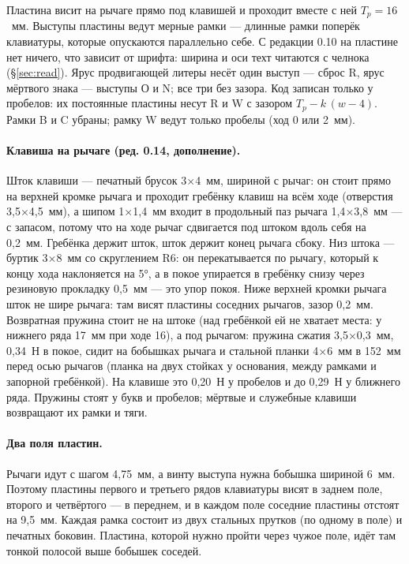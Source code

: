 Пластина висит на рычаге прямо под клавишей и проходит вместе с ней $T_p = 16$~мм. Выступы пластины ведут мерные рамки — длинные рамки поперёк клавиатуры, которые опускаются параллельно себе. С редакции 0.10 на пластине нет ничего, что зависит от шрифта: ширина и оси техт читаются с челнока (\S\ref{sec:read}). Ярус продвигающей литеры несёт один выступ — сброс R, ярус мёртвого знака — выступы О и N; все три без зазора. Код записан только у пробелов: их постоянные пластины несут R и W с зазором $T_p - k\,(w - 4)$. Рамки B и C убраны; рамку W ведут только пробелы (ход 0 или 2~мм).

\paragraph{Клавиша на рычаге (ред. 0.14, дополнение).} Шток клавиши — печатный брусок 3$\times$4~мм, шириной с рычаг: он стоит прямо на верхней кромке рычага и проходит гребёнку клавиш на всём ходе (отверстия 3,5$\times$4,5~мм), а шипом 1$\times$1,4~мм входит в продольный паз рычага 1,4$\times$3,8~мм — с запасом, потому что на ходе рычаг сдвигается под штоком вдоль себя на 0,2~мм. Гребёнка держит шток, шток держит конец рычага сбоку. Низ штока — буртик 3$\times$8~мм со скруглением R6: он перекатывается по рычагу, который к концу хода наклоняется на 5°, а в покое упирается в гребёнку снизу через резиновую прокладку 0,5~мм — это упор покоя. Ниже верхней кромки рычага шток не шире рычага: там висят пластины соседних рычагов, зазор 0,2~мм. Возвратная пружина стоит не на штоке (над гребёнкой ей не хватает места: у нижнего ряда 17~мм при ходе 16), а под рычагом: пружина сжатия 3,5$\times$0,3~мм, 0,34~Н в покое, сидит на бобышках рычага и стальной планки 4$\times$6~мм в 152~мм перед осью рычагов (планка на двух стойках у основания, между рамками и запорной гребёнкой). На клавише это 0,20~Н у пробелов и до 0,29~Н у ближнего ряда. Пружины стоят у букв и пробелов; мёртвые и служебные клавиши возвращают их рамки и тяги.

\paragraph{Два поля пластин.} Рычаги идут с шагом 4,75~мм, а винту выступа нужна бобышка шириной 6~мм. Поэтому пластины первого и третьего рядов клавиатуры висят в заднем поле, второго и четвёртого — в переднем, и в каждом поле соседние пластины отстоят на 9,5~мм. Каждая рамка состоит из двух стальных прутков (по одному в поле) и печатных боковин. Пластина, которой нужно пройти через чужое поле, идёт там тонкой полосой выше бобышек соседей.

